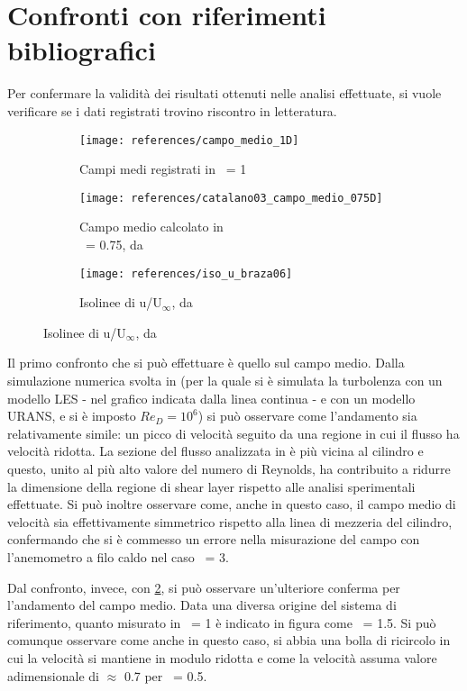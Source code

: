 \documentclass{article} %
\newcommand{\xd}{\nicefrac{\textrm{x}}{\textrm{D}}\ }
\newcommand{\yd}{\nicefrac{\textrm{y}}{\textrm{D}}\ }
\begin{document}
\section{Confronti con riferimenti bibliografici}
Per confermare la validità dei risultati ottenuti nelle analisi effettuate, si vuole verificare se i dati registrati trovino riscontro in letteratura.\par
\begin{figure}[ht!]
	\centering
	\begin{subfigure}{0.3\textwidth}
		\texttt{[image: references/campo\_medio\_1D]}
		\caption{Campi medi registrati in \xd = 1}
	\end{subfigure}
	\begin{subfigure}{0.3\textwidth}
		\texttt{[image: references/catalano03\_campo\_medio\_075D]}
		\caption{Campo medio calcolato in\\\xd = 0.75, da \cite{catalano03}}
	\end{subfigure}
	\begin{subfigure}{0.3\textwidth}
		\texttt{[image: references/iso\_u\_braza06]}
		\caption{Isolinee di u/U$_{\infty}$, da \cite[fig. 4b]{braza06}}
		\label{fig:iso_u_braza06}
	\end{subfigure}
\end{figure}
Il primo confronto che si può effettuare è quello sul campo medio. Dalla simulazione numerica svolta in \cite{catalano03} (per la quale si è simulata la turbolenza con un modello LES - nel grafico indicata dalla linea continua - e con un modello URANS, e si è imposto $Re_D = 10^6$) si può osservare come l'andamento sia relativamente simile: un picco di velocità seguito da una regione in cui il flusso ha velocità ridotta. La sezione del flusso analizzata in \cite{catalano03} è più vicina al cilindro e questo, unito al più alto valore del numero di Reynolds, ha contribuito a ridurre la dimensione della regione di shear layer rispetto alle analisi sperimentali effettuate. Si può inoltre osservare come, anche in questo caso, il campo medio di velocità sia effettivamente simmetrico rispetto alla linea di mezzeria del cilindro, confermando che si è commesso un errore nella misurazione del campo con l'anemometro a filo caldo nel caso \xd = 3.\par
Dal confronto, invece, con \cref{fig:iso_u_braza06}, si può osservare un'ulteriore conferma per l'andamento del campo medio. Data una diversa origine del sistema di riferimento, quanto misurato in \xd = 1 è indicato in figura come \xd = 1.5. Si può comunque osservare come anche in questo caso, si abbia una bolla di ricircolo in cui la velocità si mantiene in modulo ridotta e come la velocità assuma valore adimensionale di $\approx$ 0.7 per \yd = 0.5.\par
\end{document}

